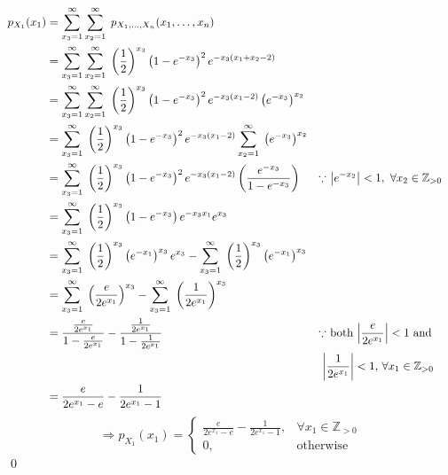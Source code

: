 \documentclass{mthe353answer}
\begin{document}
\begin{questions}
  \question{}
  \begin{align*}
    p_{X_1}(x_1) &= \sum_{x_3 = 1}^{\infty}\sum_{x_2 = 1}^{\infty}\; p_{X_1,\ldots,X_n}(x_1,\ldots,x_n)\\
    &= \sum_{x_3 = 1}^{\infty} \sum_{x_2 = 1}^{\infty}\; \left(\frac{1}{2}\right)^{x_3} \left(1-e^{-x_3}\right)^2 e^{-x_3(x_1+x_2-2)}\\
    &= \sum_{x_3 = 1}^{\infty} \sum_{x_2 = 1}^{\infty}\; \left(\frac{1}{2}\right)^{x_3} \left(1-e^{-x_3}\right)^2 e^{-x_3(x_1-2)} \left(e^{-x_3}\right)^{x_2}\\
    &= \sum_{x_3 = 1}^{\infty}\; \left(\frac{1}{2}\right)^{x_3} \left(1-e^{-x_3}\right)^2 e^{-x_3(x_1-2)} \sum_{x_2 = 1}^{\infty}\; \left(e^{-x_3}\right)^{x_2}\\
    &= \sum_{x_3 = 1}^{\infty}\; \left(\frac{1}{2}\right)^{x_3} \left(1-e^{-x_3}\right)^2 e^{-x_3(x_1-2)} \left(\frac{e^{-x_3}}{1-e^{-x_3}}\right)
      && \text{\(\because\) \( \left\lvert e^{-x_2} \right\rvert < 1,\ \forall x_2 \in \mathbb{Z}_{>0} \)}\\
    &= \sum_{x_3 = 1}^{\infty}\; \left(\frac{1}{2}\right)^{x_3} \left(1-e^{-x_3}\right) e^{-x_3x_1} e^{x_3}\\
    &= \sum_{x_3 = 1}^{\infty}\; \left(\frac{1}{2}\right)^{x_3} \left(e^{-x_1}\right)^{x_3} e^{x_3} - \sum_{x_3 = 1}^{\infty}\; \left(\frac{1}{2}\right)^{x_3} \left(e^{-x_1}\right)^{x_3}\\
    &= \sum_{x_3 = 1}^{\infty}\; \left(\frac{e}{2e^{x_1}}\right)^{x_3} - \sum_{x_3 = 1}^{\infty}\; \left(\frac{1}{2e^{x_1}}\right)^{x_3}\\
    &= \frac{\frac{e}{2e^{x_1}}}{1 - \frac{e}{2e^{x_1}}} - \frac{\frac{1}{2e^{x_1}}}{1 - \frac{1}{2e^{x_1}}}
      && \text{\(\because\) both \( \left\lvert \frac{e}{2e^{x_1}} \right\rvert < 1 \) and }\\
    & && \text{ \( \left\lvert \frac{1}{2e^{x_1}} \right\rvert < 1 \), \( \forall x_1 \in \mathbb{Z}_{>0} \) }\\
    &= \frac{e}{2e^{x_1} - e} - \frac{1}{2e^{x_1} - 1}
  \end{align*}
  \begin{displaymath}
    \Rightarrow 
    \boxed{
      p_{X_1}(x_1) = 
      \begin{cases}
        \frac{e}{2e^{x_1} - e} - \frac{1}{2e^{x_1} - 1}, & \forall x_1 \in \mathbb{Z}_{>0}\\
        0, & \text{otherwise}
      \end{cases}
    }
  \end{displaymath}
  \hfill\qed{}
\end{questions}
\end{document}
